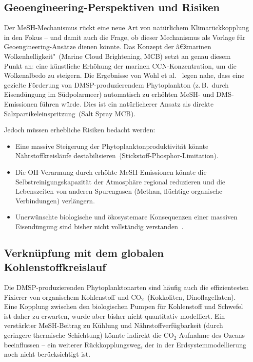﻿\documentclass[a4paper,12pt]{article}
\theoremstyle{definition}
\begin{document}
\subsection{Geoengineering-Perspektiven und Risiken}

Der MeSH-Mechanismus rückt eine neue Art von natürlichem Klimarückkopplung in den Fokus -- und
damit auch die Frage, ob dieser Mechanismus als Vorlage für Geoengineering-Ansätze dienen könnte.
Das Konzept der â€žmarinen Wolkenhelligkeit"~(Marine Cloud Brightening, MCB) setzt an genau diesem
Punkt an: eine künstliche Erhöhung der marinen CCN-Konzentration, um die Wolkenalbedo zu steigern.
Die Ergebnisse von Wohl et al.~\cite{wohl2024} legen nahe, dass eine gezielte Förderung von
DMSP-produzierendem Phytoplankton (z.\,B.\ durch Eisendüngung im Südpolarmeer) automatisch zu
erhöhten MeSH- und DMS-Emissionen führen würde. Dies ist ein natürlicherer Ansatz als direkte
Salzpartikeleinspritzung~(Salt Spray MCB).

Jedoch müssen erhebliche Risiken bedacht werden:
\begin{itemize}
  \item Eine massive Steigerung der Phytoplanktonproduktivität könnte Nährstoffkreisläufe
        destabilisieren~(Stickstoff-Phosphor-Limitation).
  \item Die OH-Verarmung durch erhöhte MeSH-Emissionen könnte die Selbstreinigungskapazität
        der Atmosphäre regional reduzieren und die Lebenszeiten von anderen Spurengasen
        (Methan, flüchtige organische Verbindungen) verlängern.
  \item Unerwünschte biologische und ökosystemare Konsequenzen einer massiven Eisendüngung
        sind bisher nicht vollständig verstanden~\cite{boyd2000}.
\end{itemize}

\subsection{Verknüpfung mit dem globalen Kohlenstoffkreislauf}

Die DMSP-produzierenden Phytoplanktonarten sind häufig auch die effizientesten Fixierer von
organischem Kohlenstoff und CO$_2$~(Kokkoliten, Dinoflagellaten). Eine Kopplung zwischen den
biologischen Pumpen für Kohlenstoff und Schwefel ist daher zu erwarten, wurde aber bisher nicht
quantitativ modelliert. Ein verstärkter MeSH-Beitrag zu Kühlung und Nährstoffverfügbarkeit
(durch geringere thermische Schichtung) könnte indirekt die CO$_2$-Aufnahme des Ozeans beeinflussen
-- ein weiterer Rückkopplungsweg, der in der Erdsystemmodellierung noch nicht berücksichtigt ist.
\end{document}
